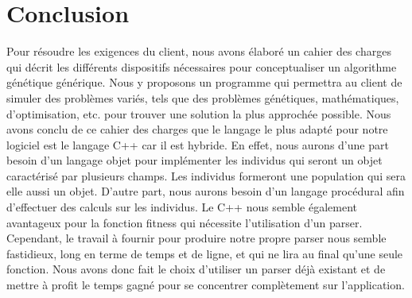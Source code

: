 \documentclass[a4paper,11pt]{article}
\begin{document}
	\section{Conclusion}
		Pour résoudre les exigences du client, nous avons élaboré un cahier des charges qui décrit les différents dispositifs nécessaires pour conceptualiser un algorithme génétique générique. Nous y proposons un programme qui permettra au client de simuler des problèmes variés, tels que des problèmes génétiques, mathématiques, d’optimisation, etc. pour trouver une solution la plus approchée possible.
		Nous avons conclu de ce cahier des charges que le langage le plus adapté pour notre logiciel est le langage C++ car il est hybride.
		En effet, nous aurons d’une part besoin d’un langage objet pour implémenter les individus qui seront un objet caractérisé par plusieurs champs. Les individus formeront une population qui sera elle aussi un objet. 
		D’autre part, nous aurons besoin d’un langage procédural afin d’effectuer des calculs sur les individus. Le C++ nous semble également avantageux pour la fonction fitness qui nécessite l'utilisation d'un parser.
		Cependant, le travail à fournir pour produire notre propre parser nous semble fastidieux, long en terme de temps et de ligne, et qui ne lira au final qu'une seule fonction. Nous avons donc fait le choix d'utiliser un parser déjà existant et de mettre à profit le temps gagné pour se concentrer complètement sur l'application.
	
\end{document}
